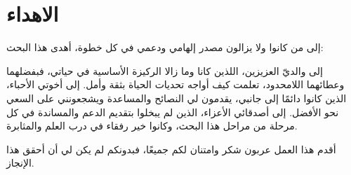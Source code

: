 \chapter*{الاهداء}

\begin{doublespacing}
	\begin{center}
إلى من كانوا ولا يزالون مصدر إلهامي ودعمي في كل خطوة، أهدى هذا البحث:

إلى والديّ العزيزين، اللذين كانا وما زالا الركيزة الأساسية في حياتي، فبفضلهما وعطائهما اللامحدود، تعلمت كيف أواجه تحديات الحياة بثقة وأمل. 
إلى أخوتي الأحباء، الذين كانوا دائمًا إلى جانبي، يقدمون لي النصائح والمساعدة ويشجعونني على السعي نحو الأفضل.
إلى أصدقائي الأعزاء، الذين لم يبخلوا بتقديم الدعم والمساندة في كل مرحلة من مراحل هذا البحث، وكانوا خير رفقاء في درب العلم والمثابرة.

أقدم هذا العمل عربون شكر وامتنان لكم جميعًا، فبدونكم لم يكن لي أن أحقق هذا الإنجاز.
\end{center}
\end{doublespacing}
